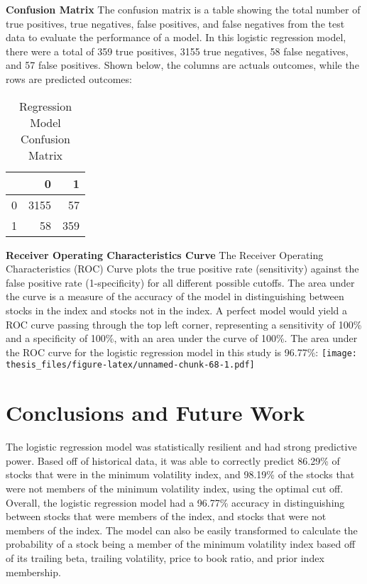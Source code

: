 \documentclass[12pt,twoside]{reedthesis}
\theoremstyle{definition}
\theoremstyle{definition}
\theoremstyle{definition}
\theoremstyle{remark}
\begin{document}
\hfill\break
\textbf{Confusion Matrix} \hfill\break
The confusion matrix is a table showing the total number of true
positives, true negatives, false positives, and false negatives from the
test data to evaluate the performance of a model. In this logistic
regression model, there were a total of 359 true positives, 3155 true
negatives, 58 false negatives, and 57 false positives. Shown below, the
columns are actuals outcomes, while the rows are predicted outcomes:
\begin{longtable}[t]{lrr}
\caption{\label{tab:unnamed-chunk-67}Regression Model Confusion Matrix}\\
\toprule
  & 0 & 1\\
\midrule
0 & 3155 & 57\\
1 & 58 & 359\\
\bottomrule
\end{longtable}
\hfill\break
\textbf{Receiver Operating Characteristics Curve} \hfill\break
The Receiver Operating Characteristics (ROC) Curve plots the true
positive rate (sensitivity) against the false positive rate
(1-specificity) for all different possible cutoffs. The area under the
curve is a measure of the accuracy of the model in distinguishing
between stocks in the index and stocks not in the index. A perfect model
would yield a ROC curve passing through the top left corner,
representing a sensitivity of 100\% and a specificity of 100\%, with an
area under the curve of 100\%. The area under the ROC curve for the
logistic regression model in this study is 96.77\%:
\texttt{[image: thesis\_files/figure-latex/unnamed-chunk-68-1.pdf]}
\hfill\break

\chapter{Conclusions and Future Work}\label{conclusions-and-future-work}

The logistic regression model was statistically resilient and had strong
predictive power. Based off of historical data, it was able to correctly
predict 86.29\% of stocks that were in the minimum volatility index, and
98.19\% of the stocks that were not members of the minimum volatility
index, using the optimal cut off. Overall, the logistic regression model
had a 96.77\% accuracy in distinguishing between stocks that were
members of the index, and stocks that were not members of the index. The
model can also be easily transformed to calculate the probability of a
stock being a member of the minimum volatility index based off of its
trailing beta, trailing volatility, price to book ratio, and prior index
membership.
\end{document}
